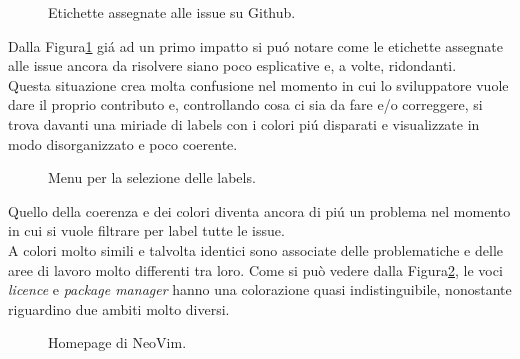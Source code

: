 \documentclass[12pt]{article} %
\begin{document}
\begin{figure}[H]
\caption{Etichette assegnate alle issue su Github.}
\label{fig:cattivoesempio1}
\end{figure}

Dalla Figura\ref{fig:cattivoesempio1} gi\'a ad un primo impatto si pu\'o notare come le etichette assegnate alle issue ancora da risolvere siano poco esplicative e, a volte, ridondanti.\\
Questa situazione crea molta confusione nel momento in cui lo sviluppatore vuole dare il proprio contributo e, controllando cosa ci sia da fare e/o correggere, si trova davanti una miriade di labels con i colori pi\'u disparati e visualizzate in modo disorganizzato e poco coerente.

\begin{figure}[H]
\caption{Menu per la selezione delle labels.}
\label{fig:cattivoesempio2}
\end{figure}

Quello della coerenza e dei colori diventa ancora di pi\'u un problema nel momento in cui si vuole filtrare per label tutte le issue.\\
A colori molto simili e talvolta identici sono associate delle problematiche e delle aree di lavoro molto differenti tra loro. Come si pu\`o vedere dalla Figura\ref{fig:cattivoesempio2}, le voci \emph{licence} e \emph{package manager} hanno una colorazione quasi indistinguibile, nonostante riguardino due ambiti molto diversi.

\begin{figure}[H]
\caption{Homepage di NeoVim.}
\label{fig:cattivoesempio3}
\end{figure}
\end{document}
